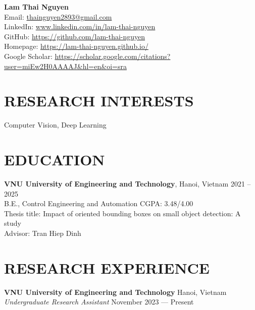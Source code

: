 \documentclass[a4paper,9pt]{extarticle}
\begin{document}
\pagestyle{fancy}
\renewcommand{\headrulewidth}{0pt}
\fancyhead{}
\fancyhead[R]{\textit{\today}}
\thispagestyle{empty} %

\begin{flushleft}
\textbf{\LARGE Lam Thai Nguyen}\\[2pt] %
Email: \href{mailto:thainguyen2893@gmail.com}{thainguyen2893@gmail.com} \\
LinkedIn: \href{https://www.linkedin.com/in/lam-thai-nguyen}{www.linkedin.com/in/lam-thai-nguyen} \\
GitHub: \href{https://github.com/lam-thai-nguyen}{https://github.com/lam-thai-nguyen}\\
Homepage: \href{https://lam-thai-nguyen.github.io/}{https://lam-thai-nguyen.github.io/} \\
Google Scholar: \href{https://scholar.google.com/citations?user=miEw2H0AAAAJ&hl=en&oi=sra}{https://scholar.google.com/citations?user=miEw2H0AAAAJ\&hl=en\&oi=sra} \\
\end{flushleft}

\section*{RESEARCH INTERESTS}
\noindent
Computer Vision, Deep Learning

\section*{EDUCATION}
\noindent
\textbf{VNU University of Engineering and Technology}, Hanoi, Vietnam \hfill 2021 -- 2025\\
B.E., Control Engineering and Automation \hfill CGPA: 3.48/4.00 \\
Thesis title: Impact of oriented bounding boxes on small object detection: A study \\
Advisor: Tran Hiep Dinh

\section*{RESEARCH EXPERIENCE}
\noindent
\textbf{VNU University of Engineering and Technology} \hfill Hanoi, Vietnam  \\ %
\textit{Undergraduate Research Assistant} \hfill November 2023 --- Present

\end{document}
